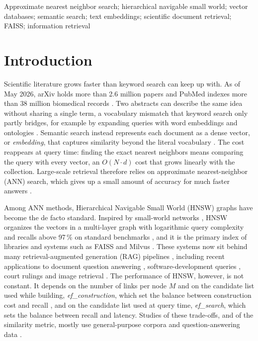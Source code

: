 \documentclass[conference, letterpaper]{IEEEtran}
\newcommand{\efc}{\textit{ef\_construction}}
\newcommand{\efs}{\textit{ef\_search}}
\begin{document}
\begin{IEEEkeywords}
Approximate nearest neighbor search; hierarchical navigable small world; vector databases; semantic search; text embeddings; scientific document retrieval; FAISS; information retrieval
\end{IEEEkeywords}

\IEEEpeerreviewmaketitle

\section{Introduction}

Scientific literature grows faster than keyword search can keep up with. As of May 2026, arXiv holds more than 2.6 million papers \cite{arxivstats} and PubMed indexes more than 38 million biomedical records \cite{pubmed}. Two abstracts can describe the same idea without sharing a single term, a vocabulary mismatch that keyword search only partly bridges, for example by expanding queries with word embeddings and ontologies \cite{rastogi2021}. Semantic search instead represents each document as a dense vector, or \textit{embedding}, that captures similarity beyond the literal vocabulary \cite{reimers2019,ajallouda2025}. The cost reappears at query time: finding the exact nearest neighbors means comparing the query with every vector, an $O(N \cdot d)$ cost that grows linearly with the collection. Large-scale retrieval therefore relies on approximate nearest-neighbor (ANN) search, which gives up a small amount of accuracy for much faster answers \cite{mathur2024}.

Among ANN methods, Hierarchical Navigable Small World (HNSW) graphs \cite{malkov2020} have become the de facto standard. Inspired by small-world networks \cite{watts1998}, HNSW organizes the vectors in a multi-layer graph with logarithmic query complexity and recalls above 97\,\% on standard benchmarks \cite{malkov2020}, and it is the primary index of libraries and systems such as FAISS \cite{johnson2021} and Milvus \cite{wang2021}. These systems now sit behind many retrieval-augmented generation (RAG) pipelines \cite{lewis2020}, including recent applications to document question answering \cite{muludi2024}, software-development queries \cite{huan2024}, court rulings \cite{ibrihich2026} and image retrieval \cite{shuo2024}. The performance of HNSW, however, is not constant. It depends on the number of links per node $M$ and on the candidate list used while building, \efc{}, which set the balance between construction cost and recall \cite{zhao2025}, and on the candidate list used at query time, \efs{}, which sets the balance between recall and latency. Studies of these trade-offs, and of the similarity metric, mostly use general-purpose corpora and question-answering data \cite{elkiran2025,rajpurkar2016}.
\end{document}
